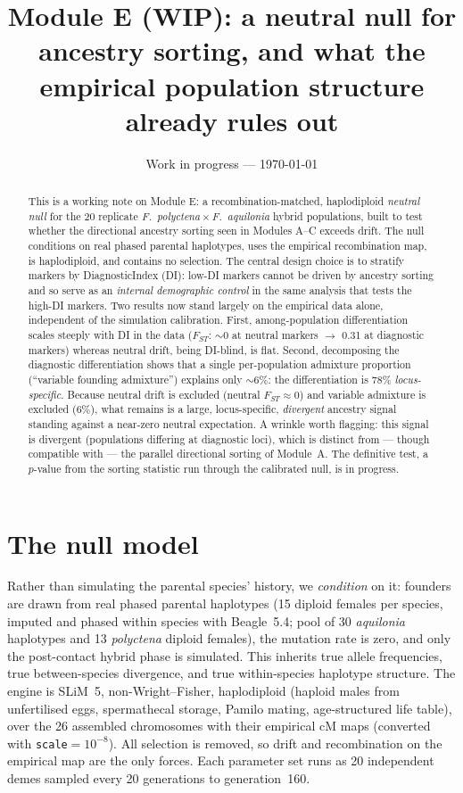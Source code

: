 \documentclass[11pt,a4paper]{article}
\title{Module E (WIP): a neutral null for ancestry sorting, and what the empirical
population structure already rules out}
\author{}
\date{Work in progress --- \today}
\begin{document}
\maketitle
\vspace{-2em}

\begin{abstract}
\noindent
This is a working note on Module E: a recombination-matched, haplodiploid
\emph{neutral null} for the 20 replicate \textit{F.\ polyctena}\,$\times$\,\textit{F.\
aquilonia} hybrid populations, built to test whether the directional ancestry
sorting seen in Modules A--C exceeds drift. The null conditions on real phased
parental haplotypes, uses the empirical recombination map, is haplodiploid, and
contains no selection. The central design choice is to stratify markers by
DiagnosticIndex (DI): low-DI markers cannot be driven by ancestry sorting and so
serve as an \emph{internal demographic control} in the same analysis that tests
the high-DI markers. Two results now stand largely on the empirical data alone,
independent of the simulation calibration. First, among-population differentiation
scales steeply with DI in the data ($F_{ST}$: $\sim$0 at neutral markers $\to$
0.31 at diagnostic markers) whereas neutral drift, being DI-blind, is flat.
Second, decomposing the diagnostic differentiation shows that a single
per-population admixture proportion (``variable founding admixture'') explains
only $\sim$6\%: the differentiation is 78\% \emph{locus-specific}. Because neutral
drift is excluded (neutral $F_{ST}\approx0$) and variable admixture is excluded
(6\%), what remains is a large, locus-specific, \emph{divergent} ancestry signal
standing against a near-zero neutral expectation. A wrinkle worth flagging: this
signal is divergent (populations differing at diagnostic loci), which is distinct
from --- though compatible with --- the parallel directional sorting of Module~A.
The definitive test, a $p$-value from the sorting statistic run through the
calibrated null, is in progress.
\end{abstract}

\section{The null model}

Rather than simulating the parental species' history, we \emph{condition} on it:
founders are drawn from real phased parental haplotypes (15 diploid females per
species, imputed and phased within species with Beagle~5.4; pool of 30
\textit{aquilonia} haplotypes and 13 \textit{polyctena} diploid females), the
mutation rate is zero, and only the post-contact hybrid phase is simulated. This
inherits true allele frequencies, true between-species divergence, and true
within-species haplotype structure. The engine is SLiM~5, non-Wright--Fisher,
haplodiploid (haploid males from unfertilised eggs, spermathecal storage, Pamilo
mating, age-structured life table), over the 26 assembled chromosomes with their
empirical cM maps (converted with \texttt{scale}$=10^{-8}$). All selection is
removed, so drift and recombination on the empirical map are the only forces. Each
parameter set runs as 20 independent demes sampled every 20 generations to
generation~160.
\end{document}
